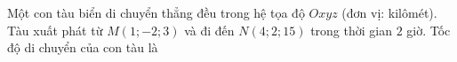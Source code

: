 \begin{ex}
Một con tàu biển di chuyển thẳng đều trong hệ tọa độ $Oxyz$ (đơn vị: kilômét). Tàu xuất phát từ $M(1;-2;3)$ và đi đến $N(4;2;15)$ trong thời gian $2$ giờ. Tốc độ di chuyển của con tàu là
\end{ex}
